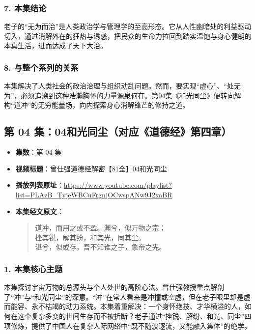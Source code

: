 \subsubsection{7. 本集结论}
老子的“无为而治”是人类政治学与管理学的至高形态。它从人性幽暗处的利益驱动切入，通过消解外在的狂热与诱惑，把民众的生命力拉回到踏实温饱与身心健朗的本真生活，进而达成了天下大治。

\subsubsection{8. 与整个系列的关系}
本集解决了人类社会的政治治理与组织动乱问题。然而，要实现“虚心”、“处无为”，必须追溯到这种浩瀚胸怀的力量源泉何在。第04集《和光同尘》便转向解构“道冲”的无穷能量场，向内探索身心消解锋芒的修持之道。

\clearpage

\subsection{第 04 集：04和光同尘（对应《道德经》第四章）}
\label{sec:ep04}

\begin{itemize}
    \item \textbf{集数}：第 04 集
    \item \textbf{视频标题}：曾仕强道德经解密【81全】04和光同尘
    \item \textbf{播放列表原址}：\url{https://www.youtube.com/playlist?list=PLAzB_TyjeWBCuFrgnjOCwspANw9J2xaBR}
    \item \textbf{本集经文原文}：
    \begin{quote}\kaishu
    道冲，而用之或不盈。渊兮，似万物之宗；\\
    挫其锐，解其纷，和其光，同其尘。\\
    湛兮，似或存。吾不知谁之子，象帝之先。
    \end{quote}
\end{itemize}

\subsubsection{1. 本集核心主题}
本集探讨宇宙万物的总源头与个人处世的高阶心法。曾仕强教授重点解剖了“冲”与“和光同尘”的深意。“冲”在常人看来是冲撞或空虚，但在老子眼里却是虚而能容、永不枯竭的动力系统。本集着重解决：一个身怀绝技、才华横溢的人，如何在这个复杂多变的世间生存而不被折断？老子通过“挫锐、解纷、和光、同尘”四项修炼，提供了中国人在复杂人际网络中“既不随波逐流，又能融入集体”的绝学。


